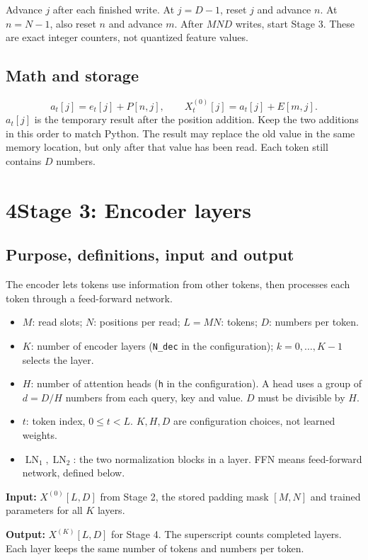 \documentclass[11pt,a4paper]{article}
\newcommand{\LN}{\operatorname{LN}}
\begin{document}
Advance $j$ after each finished write. At $j=D-1$, reset $j$ and advance $n$. At $n=N-1$, also reset $n$ and advance $m$. After $MND$ writes, start Stage 3. These are exact integer counters, not quantized feature values.

\subsection*{Math and storage}
\[
a_t[j]=e_t[j]+P[n,j],\qquad X^{(0)}_t[j]=a_t[j]+E[m,j].
\]
$a_t[j]$ is the temporary result after the position addition. Keep the two additions in this order to match Python. The result may replace the old value in the same memory location, but only after that value has been read. Each token still contains $D$ numbers.

\newpage
\section*{4\quad Stage 3: Encoder layers}
\subsection*{Purpose, definitions, input and output}
The encoder lets tokens use information from other tokens, then processes each token through a feed-forward network.
\begin{itemize}
\item $M$: read slots; $N$: positions per read; $L=MN$: tokens; $D$: numbers per token.
\item $K$: number of encoder layers (\texttt{N\_dec} in the configuration); $k=0,\ldots,K-1$ selects the layer.
\item $H$: number of attention heads (\texttt{h} in the configuration). A head uses a group of $d=D/H$ numbers from each query, key and value. $D$ must be divisible by $H$.
\item $t$: token index, $0\leq t<L$. $K,H,D$ are configuration choices, not learned weights.
\item $\LN_1,\LN_2$: the two normalization blocks in a layer. FFN means feed-forward network, defined below.
\end{itemize}
\textbf{Input:} $X^{(0)}[L,D]$ from Stage 2, the stored padding mask $[M,N]$ and trained parameters for all $K$ layers.

\textbf{Output:} $X^{(K)}[L,D]$ for Stage 4. The superscript counts completed layers. Each layer keeps the same number of tokens and numbers per token.
\end{document}

